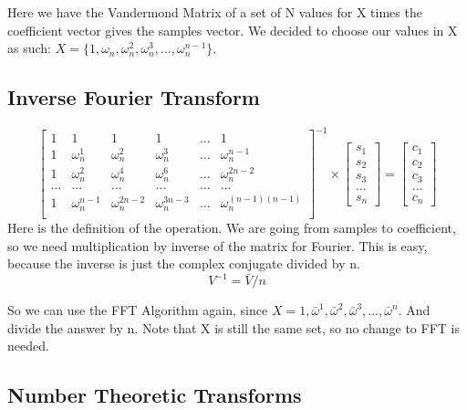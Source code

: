 Here we have the Vandermond Matrix of a set of N values for X times the coefficient vector gives the samples vector. We decided to choose our values in X as such:
$ X = \{ 1, \omega_n, \omega_n^2, \omega_n^3, ..., \omega_n^{n-1} \} $.

\subsection{Inverse Fourier Transform}

\begin{equation}
  \begin{bmatrix}
    1 & 1 & 1 & 1 & ... & 1 \\
    1 & \omega_n^1 & \omega_n^2 & \omega_n^3 & ... & \omega_n^{ n-1} \\
    1 & \omega_n^2 & \omega_n^4 & \omega_n^6 & ... & \omega_n^{2n-2} \\
    ... & ... & ... & ... & ... & ... \\
    1 & \omega_n^{n-1} & \omega_n^{2n-2} & \omega_n^{3n-3} & ... & \omega_n^{(n-1)(n-1)} \\
  \end{bmatrix} ^{-1} \times
  \begin{bmatrix}
    s_1 \\ s_2 \\ s_3 \\ ... \\ s_n
  \end{bmatrix} =
  \begin{bmatrix}
    c_1 \\ c_2 \\ c_3 \\ ... \\ c_n
  \end{bmatrix}
\end{equation}
Here is the definition of the operation. We are going from samples to coefficient, so we need multiplication by inverse of the matrix for Fourier. This is easy, because the inverse is just the complex conjugate divided by n.
\begin{equation}
  V^{-1} = \bar{V} / n
\end{equation}

So we can use the FFT Algorithm again, since $X = {1, \bar{\omega}^1, \bar{\omega}^2, \bar{\omega}^3, ..., \bar{\omega}^n}$. And divide the answer by n. Note that X is still the same set, so no change to FFT is needed.


\subsection{Number Theoretic Transforms}

